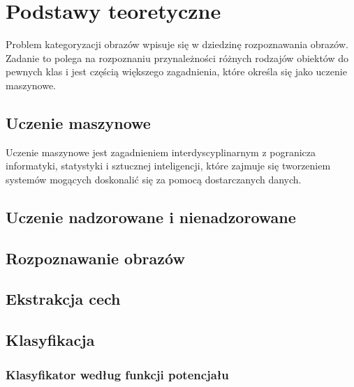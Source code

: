 \chapter{Podstawy teoretyczne}

Problem kategoryzacji obrazów wpisuje się w dziedzinę rozpoznawania obrazów. Zadanie to polega na rozpoznaniu przynależności różnych rodzajów obiektów do pewnych klas\cite{Tad91} i jest częścią większego zagadnienia, które określa się jako uczenie maszynowe.

\section{Uczenie maszynowe}

Uczenie maszynowe jest zagadnieniem interdyscyplinarnym z pogranicza informatyki, statystyki i sztucznej inteligencji, które zajmuje się tworzeniem systemów mogących doskonalić się za pomocą dostarczanych danych.










\section{Uczenie nadzorowane i nienadzorowane}


\section{Rozpoznawanie obrazów}

\section{Ekstrakcja cech}

\section{Klasyfikacja}

	\subsection{Klasyfikator według funkcji potencjału}
	
